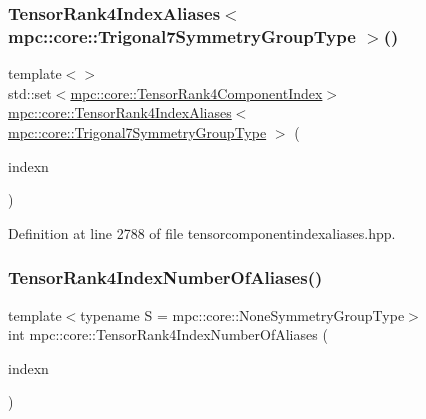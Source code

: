 \subsubsection{\texorpdfstring{Tensor\+Rank4\+Index\+Aliases$<$ mpc\+::core\+::\+Trigonal7\+Symmetry\+Group\+Type $>$()}{TensorRank4IndexAliases< mpc::core::Trigonal7SymmetryGroupType >()}}
{\footnotesize\ttfamily template$<$$>$ \\
std\+::set$<$\mbox{\hyperlink{namespacempc_1_1core_a54c081f41b2475abd10182bf023805d2}{mpc\+::core\+::\+Tensor\+Rank4\+Component\+Index}}$>$ \mbox{\hyperlink{namespacempc_1_1core_a40d1fb8009b3f7c34a6ea01a4b46027f}{mpc\+::core\+::\+Tensor\+Rank4\+Index\+Aliases}}$<$ \mbox{\hyperlink{structmpc_1_1core_1_1_trigonal7_symmetry_group_type}{mpc\+::core\+::\+Trigonal7\+Symmetry\+Group\+Type}} $>$ (\begin{DoxyParamCaption}\item[{const \mbox{\hyperlink{classmpc_1_1core_1_1_tensor_rank_n_component_index}{mpc\+::core\+::\+Tensor\+Rank\+N\+Component\+Index}}$<$ 4 $>$ \&}]{indexn }\end{DoxyParamCaption})\hspace{0.3cm}{\ttfamily [inline]}}



Definition at line 2788 of file tensorcomponentindexaliases.\+hpp.

\mbox{\label{namespacempc_1_1core_a8d98ed039053b282c6ce8cff2fad214c}} 
\subsubsection{\texorpdfstring{Tensor\+Rank4\+Index\+Number\+Of\+Aliases()}{TensorRank4IndexNumberOfAliases()}\hspace{0.1cm}{\footnotesize\ttfamily [1/2]}}
{\footnotesize\ttfamily template$<$typename S  = mpc\+::core\+::\+None\+Symmetry\+Group\+Type$>$ \\
int mpc\+::core\+::\+Tensor\+Rank4\+Index\+Number\+Of\+Aliases (\begin{DoxyParamCaption}\item[{const \mbox{\hyperlink{classmpc_1_1core_1_1_tensor_rank_n_component_index}{mpc\+::core\+::\+Tensor\+Rank\+N\+Component\+Index}}$<$ 4 $>$ \&}]{indexn }\end{DoxyParamCaption})\hspace{0.3cm}{\ttfamily [inline]}}



